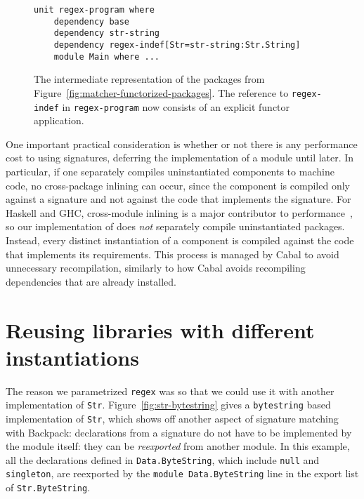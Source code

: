\begin{figure}
\begin{lstlisting}
unit regex-program where
    dependency base
    dependency str-string
    dependency regex-indef[Str=str-string:Str.String]
    module Main where ...
\end{lstlisting}
\caption{The intermediate representation of the packages from Figure~\ref{fig:matcher-functorized-packages}.
The reference to \texttt{regex-indef} in \texttt{regex-program} now consists of an explicit functor application.}
\label{fig:matcher-bkp}
\end{figure}

One important practical consideration is whether or not there is any
performance cost to using signatures, deferring the implementation of
a module until later.  In particular, if one separately
compiles uninstantiated components to machine code, no cross-package
inlining can occur, since the component is compiled only against a
signature and not against the code that implements the signature.  For
Haskell and GHC, cross-module inlining is a major contributor to
performance~\cite{PeytonJones:2002:SGH:968417.968422}, so our implementation of \Backpack{} does \emph{not}
separately compile uninstantiated packages. Instead, every distinct
instantiation of a component is compiled against the code that
implements its requirements. This process is managed by Cabal to avoid
unnecessary recompilation, similarly to how Cabal avoids recompiling
dependencies that are already installed.

\section{Reusing libraries with different instantiations}

The reason we parametrized \verb|regex| was so that we could use it
with another implementation of \verb|Str|.  Figure~\ref{fig:str-bytestring}
gives a \verb|bytestring| based implementation of \verb|Str|, which shows
off another aspect of signature matching with Backpack: declarations from
a signature do not have to be implemented by the module itself: they can
be \emph{reexported} from another module.  In this example, all the declarations
defined in \verb|Data.ByteString|, which include \verb|null| and \verb|singleton|,
are reexported by the \verb|module Data.ByteString| line in the export list
of \verb|Str.ByteString|.

